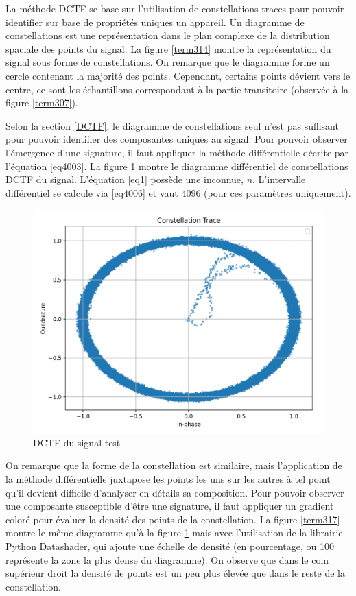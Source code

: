 La méthode \ac{DCTF} se base sur l'utilisation de constellations traces pour pouvoir identifier sur base de propriétés uniques un appareil. Un diagramme de constellations est une représentation dans le plan complexe de la distribution spaciale des points du signal. La figure \ref{term314} montre la représentation  du signal sous forme de constellations. On remarque que le diagramme forme un cercle contenant la majorité des points. Cependant, certains points dévient vers le centre, ce sont les échantillons correspondant à la partie transitoire (observée à la figure \ref{term307}).

\vspace{0.1cm}

Selon la section \ref{DCTF}, le diagramme de constellations seul n'est pas suffisant pour pouvoir identifier des composantes uniques au signal. Pour pouvoir observer l'émergence d'une signature, il faut appliquer la méthode différentielle décrite par l'équation \ref{eq4003}. La figure \ref{term316} montre le diagramme différentiel de constellations \ac{DCTF} du signal. L'équation \ref{eq1} possède une inconnue, $n$. L'intervalle différentiel se calcule via \ref{eq4006} et vaut 4096 (pour ces paramètres uniquement).


\newpage

\begin{figure}[h]
\centering

\includegraphics[scale=0.25]{images/dctf3.png}
\caption{DCTF du signal test}\label{term316}
\end{figure}

On remarque que la forme de la constellation est similaire, mais l'application de la méthode différentielle juxtapose les points les uns sur les autres à tel point qu'il devient difficile d'analyser en détails sa composition. Pour pouvoir observer une composante susceptible d'être une signature, il faut appliquer un gradient coloré pour évaluer la densité des points de la constellation. La figure \ref{term317} montre le même diagramme qu'à la figure \ref{term316} mais avec l'utilisation de la librairie Python Datashader, qui ajoute une échelle de densité (en pourcentage, ou 100 représente la zone la plus dense du diagramme). On observe que dans le coin supérieur droit la densité de points est un peu plus élevée que dans le reste de la constellation.

